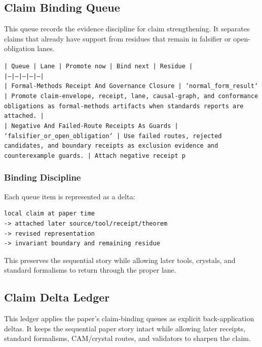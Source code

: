 \documentclass[11pt]{article}
\begin{document}
\subsection*{Claim Binding Queue}

This queue records the evidence discipline for claim strengthening. It separates claims that already have support from residues that remain in falsifier or open-obligation lanes.

\noindent\texttt{| Queue | Lane | Promote now | Bind next | Residue |}\\
\noindent\texttt{|---|---|---|---|---|}\\
\noindent\texttt{| Formal-Methods Receipt And Governance Closure | `normal\_form\_result` | Promote claim-envelope, receipt, lane, causal-graph, and conformance obligations as formal-methods artifacts when standards reports are attached. |}\\
\noindent\texttt{| Negative And Failed-Route Receipts As Guards | `falsifier\_or\_open\_obligation` | Use failed routes, rejected candidates, and boundary receipts as exclusion evidence and counterexample guards. | Attach negative receipt p}\\

\subsubsection*{Binding Discipline}

Each queue item is represented as a delta:

\begin{verbatim}
local claim at paper time
-> attached later source/tool/receipt/theorem
-> revised representation
-> invariant boundary and remaining residue
\end{verbatim}

This preserves the sequential story while allowing later tools, crystals, and
standard formalisms to return through the proper lane.

\subsection*{Claim Delta Ledger}

This ledger applies the paper's claim-binding queues as explicit back-application
deltas. It keeps the sequential paper story intact while allowing later
receipts, standard formalisms, CAM/crystal routes, and validators to sharpen the
claim.
\end{document}
